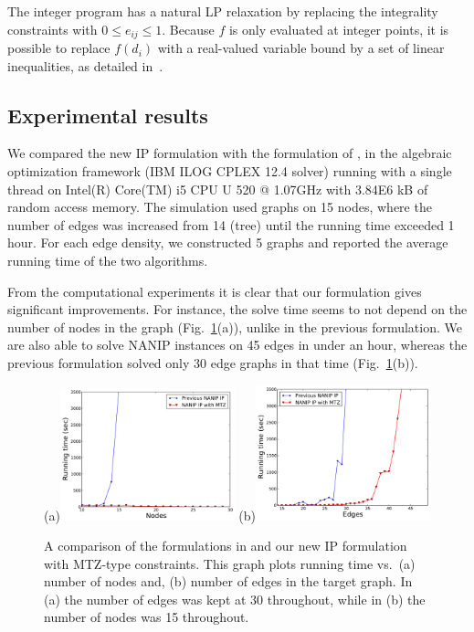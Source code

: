 \documentclass[english]{llncs}
\begin{document}
The integer program has a natural LP relaxation by replacing the integrality
constraints with $0 \leq e_{ij} \leq 1$. 
Because $f$ is only evaluated at integer points, it is possible to replace $f(d_i)$
with a real-valued variable bound by a set of linear inequalities, as detailed in~\cite{Gutfraind14}.

\subsection{Experimental results}

We compared the new IP formulation with the formulation of
\cite{Gutfraind14}, in the algebraic optimization framework
(IBM ILOG CPLEX 12.4 solver) running with a single thread on Intel(R) Core(TM)
i5 CPU U 520  @ 1.07GHz with 3.84E6 kB of random access memory.  The simulation
used graphs on 15 nodes, where the number of edges was increased from 14 (tree)
until the running time exceeded 1 hour.  For each edge density, we constructed
5 graphs and reported the average running time of the two algorithms.

From the computational experiments it is clear that our formulation gives
significant improvements.  For instance, the solve time seems to not depend on
the number of nodes in the graph (Fig.~\ref{fig:iptime}(a)), unlike in the
previous formulation.  We are also able to solve NANIP instances on 45 edges in
under an hour, whereas the previous formulation solved only 30 edge graphs in
that time (Fig.~\ref{fig:iptime}(b)).

\begin{figure}[th]
\begin{centering}
(a)\includegraphics[width=0.45\textwidth]{perf_ip_nodes} 
(b)\includegraphics[width=0.45\textwidth]{perf_ip_edges} 
\par
\end{centering}
\caption{A comparison of the formulations in
\cite{Gutfraind14} and our new IP formulation with MTZ-type
constraints.  This graph plots running time vs.\ (a) number of nodes and, (b)
number of edges in the target graph.
In (a) the number of edges was kept at 30 throughout, while in (b) the number
of nodes was 15 throughout.\label{fig:iptime}} 
\end{figure}
\end{document}
